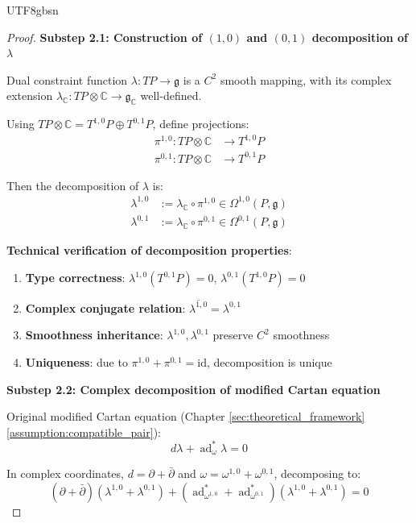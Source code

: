 \documentclass[a4paper,12pt]{extarticle}
\theoremstyle{definition}
\begin{document}
\begin{CJK}{UTF8}{gbsn}
\begin{proof}
\textbf{Substep 2.1: Construction of $(1,0)$ and $(0,1)$ decomposition of $\lambda$}

Dual constraint function $\lambda: TP \to \mathfrak{g}$ is a $C^2$ smooth mapping, with its complex extension $\lambda_\mathbb{C}: TP \otimes \mathbb{C} \to \mathfrak{g}_\mathbb{C}$ well-defined.

Using $TP \otimes \mathbb{C} = T^{1,0}P \oplus T^{0,1}P$, define projections:
\begin{align}
\pi^{1,0}: TP \otimes \mathbb{C} &\to T^{1,0}P \\
\pi^{0,1}: TP \otimes \mathbb{C} &\to T^{0,1}P
\end{align}

Then the decomposition of $\lambda$ is:
\begin{align}
\lambda^{1,0} &:= \lambda_\mathbb{C} \circ \pi^{1,0} \in \Omega^{1,0}(P, \mathfrak{g}) \\
\lambda^{0,1} &:= \lambda_\mathbb{C} \circ \pi^{0,1} \in \Omega^{0,1}(P, \mathfrak{g})
\end{align}

\textbf{Technical verification of decomposition properties}:
\begin{enumerate}
    \item \textbf{Type correctness}: $\lambda^{1,0}(T^{0,1}P) = 0$, $\lambda^{0,1}(T^{1,0}P) = 0$
    \item \textbf{Complex conjugate relation}: $\overline{\lambda^{1,0}} = \lambda^{0,1}$
    \item \textbf{Smoothness inheritance}: $\lambda^{1,0}, \lambda^{0,1}$ preserve $C^2$ smoothness
    \item \textbf{Uniqueness}: due to $\pi^{1,0} + \pi^{0,1} = \text{id}$, decomposition is unique
\end{enumerate}

\textbf{Substep 2.2: Complex decomposition of modified Cartan equation}

Original modified Cartan equation (Chapter \ref{sec:theoretical_framework} \ref{assumption:compatible_pair}):
\begin{equation}
d\lambda + \operatorname{ad}^*_\omega \lambda = 0
\end{equation}

In complex coordinates, $d = \partial + \bar{\partial}$ and $\omega = \omega^{1,0} + \omega^{0,1}$, decomposing to:
\begin{equation}
(\partial + \bar{\partial})(\lambda^{1,0} + \lambda^{0,1}) + (\operatorname{ad}^*_{\omega^{1,0}} + \operatorname{ad}^*_{\omega^{0,1}})(\lambda^{1,0} + \lambda^{0,1}) = 0
\end{equation}


\end{proof}
\end{CJK}
\end{document}
